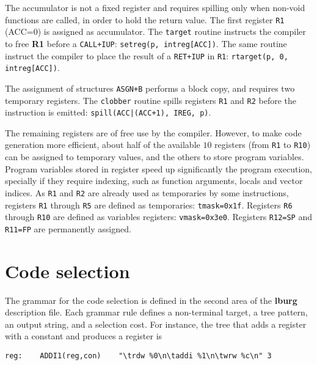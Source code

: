 The accumulator is not a fixed register and requires spilling
only when non-void functions are called, in order to hold the
return value.
The first register {\tt R1} ({\sc ACC=0}) is assigned as accumulator.
The {\tt target} routine instructs the compiler to free {\bf R1}
before a {\tt CALL+IUP}: {\tt setreg(p, intreg[ACC])}.
The same routine instruct the compiler to place the result of a
{\tt RET+IUP} in {\tt R1}: {\tt rtarget(p, 0, intreg[ACC])}.

The assignment of structures {\tt ASGN+B} performs a block copy,
and requires two temporary registers.
The {\tt clobber} routine spills registers {\tt R1} and {\tt R2}
before the instruction is emitted: {\tt spill(ACC|(ACC+1), IREG, p)}.

The remaining registers are of free use by the compiler.
However, to make code generation more efficient, about half of the
available $10$ registers (from {\tt R1} to {\tt R10}) can be assigned
to temporary values, and the others to store program variables.
Program variables stored in register speed up significantly the
program execution, specially if they require indexing, such as
function arguments, locals and vector indices.
As {\tt R1} and {\tt R2} are already used as temporaries by some
instructions, registers {\tt R1} through {\tt R5} are defined as
temporaries: {\tt tmask=0x1f}.
Registers {\tt R6} through {\tt R10} are defined as variables
registers: {\tt vmask=0x3e0}.
Registers {\tt R12=SP} and {\tt R11=FP} are permanently assigned.

\section{Code selection}

The grammar for the code selection is defined in the second
area of the {\bf lburg} description file.
Each grammar rule defines a non-terminal target, a tree pattern,
an output string, and a selection cost.
For instance, the tree that adds a register with a constant and
produces a register is
\begin{Verbatim}[baselinestretch=1.2]
reg:    ADDI1(reg,con)    "\trdw %0\n\taddi %1\n\twrw %c\n" 3
\end{Verbatim}

